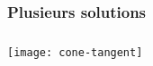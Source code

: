 \documentclass{beamer}
\newcommand{\R}{{\ensuremath\mathbb{R}}}
\begin{document}
\begin{frame}
  \frametitle{Plusieurs solutions}

\end{frame}

\begin{frame}
  \frametitle{}

  \begin{center}
      \texttt{[image: cone-tangent]}    
  \end{center}

\end{frame}



  


\end{document}

